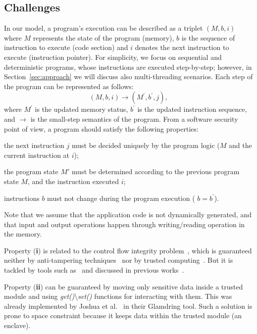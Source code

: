\subsection{Challenges}
\label{ssect:design-theory}
In our model, a program's execution can be described as a triplet $(M,b,i)$ 
where $M$ represents the state of the program (\ie memory), $b$ is the sequence 
of instruction to execute (\ie code section) and $i$ denotes the next 
instruction to execute (\ie instruction pointer).
For simplicity, we focus on sequential and deterministic programs, whose 
instructions are executed step-by-step; however, in Section~\ref{sec:approach} 
we will discuss also multi-threading scenarios.
Each step of the program can be represented as follows:
\[ (M,b,i) \rightarrow (M^\prime,b^\prime,j), \]
where $M^\prime$ is the updated memory status, $b^\prime$ is the updated 
instruction sequence, and $\rightarrow$ is the small-step semantics of the 
program.
From a software security point of view, a program should satisfy the following 
properties:
\begin{enumerate*}[label=(\textbf{\roman*})]
	\item the next instruction $j$ must be decided uniquely by the program 
	logic (\ie $M$ and the current instruction at $i$);
	\item the program state $M'$ must be determined according to the previous 
	program state $M$, and the instruction executed $i$; %
	\item instructions $b$ must not change during the program execution (\ie 
	$b=b^\prime$).
\end{enumerate*}
Note that we assume that the application code is not dynamically generated, and 
that input and output operations happen through writing/reading operation in 
the memory.

Property (\textbf{i}) is related to the control flow integrity 
problem~\citep{8269390}, which is guaranteed neither by anti-tampering 
techniques~\citep{nagra2009surreptitious} nor by trusted 
computing~\citep{lee2017hacking}.
But it is tackled by tools such as~\citep{microsoftcfg,tice2014enforcing} and 
discussed in previous 
works~\citep{onarlioglu2010g,wang2010hypersafe,abadi2005control,zhang2013control,davi2014stitching}.

Property (\textbf{ii}) can be guaranteed by moving only sensitive data inside a 
trusted module and using \emph{get()}\textbackslash{}\emph{set()} functions for 
interacting with them.
This was already implemented by Joshua et al.~\citep{lind2017glamdring} in 
their Glamdring tool.
Such a solution is prone to space constraint because it keeps data within the 
trusted module (\ie an enclave).

